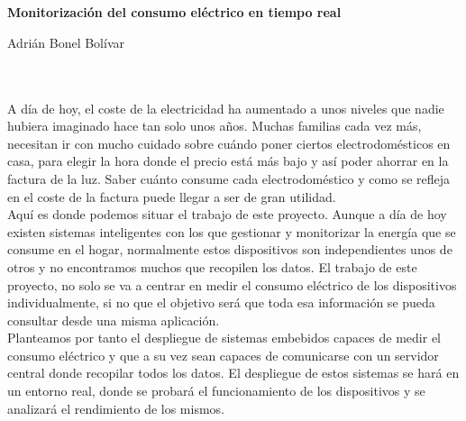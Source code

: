 \chapter*{}


%



\cleardoublepage
\thispagestyle{empty}

\begin{center}
{\large\bfseries Monitorización del consumo eléctrico en tiempo real}\\
\end{center}
\begin{center}
Adrián Bonel Bolívar\\
\end{center}

\\

\vspace{0.7cm}
\\

A día de hoy, el coste de la electricidad ha aumentado a unos niveles que nadie hubiera imaginado hace tan solo unos años. Muchas familias cada vez más, necesitan ir con mucho cuidado sobre cuándo poner ciertos electrodomésticos en casa, para elegir la hora donde el precio está más bajo y así poder ahorrar en la factura de la luz. Saber cuánto consume cada electrodoméstico y como se refleja en el coste de la factura puede llegar a ser de gran utilidad. \\

Aquí es donde podemos situar el trabajo de este proyecto. Aunque a día de hoy existen sistemas inteligentes con los que gestionar y monitorizar la energía que se consume en el hogar, normalmente estos dispositivos son independientes unos de otros y no encontramos muchos que recopilen los datos. El trabajo de este proyecto, no solo se va a centrar en medir el consumo eléctrico de los dispositivos individualmente, si no que el objetivo será que toda esa información se pueda consultar desde una misma aplicación. \\

Planteamos por tanto el despliegue de sistemas embebidos capaces de medir el consumo eléctrico y que a su vez sean capaces de comunicarse con un servidor central donde recopilar todos los datos. El despliegue de estos sistemas se hará en un entorno real, donde se probará el funcionamiento de los dispositivos y se analizará el rendimiento de los mismos. \\

